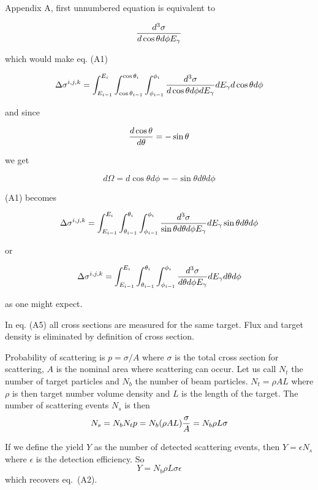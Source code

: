 \documentclass{article}
\begin{document}
Appendix A, first unnumbered equation is equivalent to 

$${d^3\sigma \over d\cos\theta d\phi E_\gamma}$$

which would make eq. (A1)

$$\Delta\sigma^{i,j,k} = \int^{E_i}_{E_{i-1}}\int^{\cos\theta_i}_{\cos\theta_{i-1}}\int^{\phi_i}_{\phi_{i-1}} {d^3\sigma \over d\cos\theta d\phi dE_\gamma}dE_\gamma d\cos\theta d\phi$$

and since

$${d\cos\theta \over d\theta} = -\sin\theta$$

we get

$$ d\Omega = d\cos\theta d\phi = -\sin\theta d\theta d\phi $$

(A1) becomes

$$\Delta\sigma^{i,j,k} = \int^{E_i}_{E_{i-1}}\int^{\theta_i}_{\theta_{i-1}}\int^{\phi_i}_{\phi_{i-1}} {d^3\sigma \over \sin\theta d\theta d\phi E_\gamma} dE_\gamma \sin\theta d\theta d\phi$$

or

$$\Delta\sigma^{i,j,k} = \int^{E_i}_{E_{i-1}}\int^{\theta_i}_{\theta_{i-1}}\int^{\phi_i}_{\phi_{i-1}} {d^3\sigma \over d\theta d\phi E_\gamma} dE_\gamma d\theta d\phi$$

as one might expect.

In eq. (A5) all cross sections are measured for the same target. Flux and target density is eliminated by definition of cross section.

Probability of scattering is $p = \sigma/A$ where $\sigma$ is the total cross section for scattering, $A$ is the nominal area where scattering can occur. Let us call $N_t$ the number of target particles and $N_b$ the number of beam particles. $N_t = \rho AL$ where $\rho$ is then target number volume density and $L$ is the length of the target. The number of scattering events $N_s$ is then
$$
N_s = N_b N_t p = N_b(\rho A L){\sigma\over A} = N_b\rho L\sigma
$$

If we define the yield $Y$ as the number of detected scattering events, then $Y = \epsilon N_s$ where $\epsilon$ is the detection efficiency. So
$$
Y = N_b\rho L\sigma\epsilon
$$
which recovers eq.~(A2).
\end{document}
